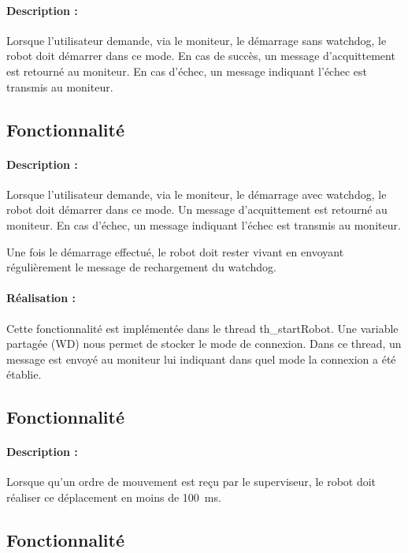 \documentclass[11pt, a4paper]{paper}
\newcounter{cptreq}
\begin{document}
{{{\paragraph{Description :} Lorsque l'utilisateur demande, via le moniteur, le démarrage sans watchdog, le robot doit démarrer dans ce mode. En cas de succès, un message d'acquittement est retourné au moniteur. En cas d'échec, un message indiquant l'échec est transmis au moniteur.

}
\subsection{Fonctionnalité \thecptreq}

\paragraph{Description :} Lorsque l'utilisateur demande, via le moniteur, le démarrage avec watchdog, le robot doit démarrer dans ce mode. Un message d'acquittement est retourné au moniteur. En cas d'échec, un message indiquant l'échec est transmis au moniteur.

Une fois le démarrage effectué, le robot doit rester vivant en envoyant régulièrement le message de rechargement du watchdog.

\paragraph{\color{black}Réalisation :}  {\color{black} Cette fonctionnalité est implémentée dans le thread th\_startRobot. Une variable partagée (WD) nous permet de stocker le mode de connexion. Dans ce thread, un message est envoyé au moniteur lui indiquant dans quel mode la connexion a été établie.}

{\color{black}
\subsection{Fonctionnalité \thecptreq *}

\paragraph{Description :} Lorsque qu'un ordre de mouvement est reçu par le superviseur, le robot doit réaliser ce déplacement en moins de 100~ms.

}
\subsection{Fonctionnalité \thecptreq}

}}
\end{document}
